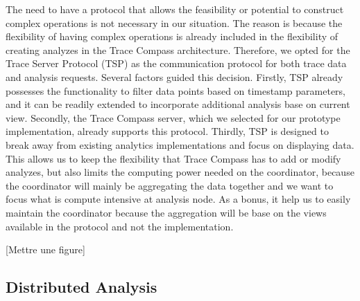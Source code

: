The need to have a protocol that allows the feasibility or potential to construct complex operations is not necessary in our situation. The reason is because the flexibility of having complex operations is already included in the flexibility of creating analyzes in the Trace Compass architecture. Therefore, we opted for the Trace Server Protocol (TSP) as the communication protocol for both trace data and analysis requests. Several factors guided this decision. Firstly, TSP already possesses the functionality to filter data points based on timestamp parameters, and it can be readily extended to incorporate additional analysis base on current view. Secondly, the Trace Compass server, which we selected for our prototype implementation, already supports this protocol. Thirdly, TSP is designed to break away from existing analytics implementations and focus on displaying data. This allows us to keep the flexibility that Trace Compass has to add or modify analyzes, but also limits the computing power needed on the coordinator, because the coordinator will mainly be aggregating the data together and we want to focus what is compute intensive at analysis node. As a bonus, it help us to easily maintain the coordinator because the aggregation will be base on the views available in the protocol and not the implementation.

[Mettre une figure]

\subsection{}

\subsection{Distributed Analysis}

